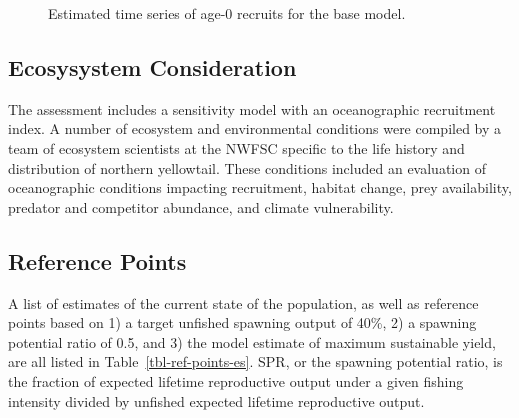 \documentclass[
]{scrartcl}
\begin{document}
\endgroup

\begin{figure}[H]


\caption{\label{fig-es-recruits}Estimated time series of age-0 recruits
for the base model.}

\end{figure}%

\subsection{Ecosysystem Consideration}\label{ecosysystem-consideration}

The assessment includes a sensitivity model with an oceanographic
recruitment index. A number of ecosystem and environmental conditions
were compiled by a team of ecosystem scientists at the NWFSC specific to
the life history and distribution of northern yellowtail. These
conditions included an evaluation of oceanographic conditions impacting
recruitment, habitat change, prey availability, predator and competitor
abundance, and climate vulnerability.

\subsection{Reference Points}\label{reference-points}

A list of estimates of the current state of the population, as well as
reference points based on 1) a target unfished spawning output of 40\%,
2) a spawning potential ratio of 0.5, and 3) the model estimate of
maximum sustainable yield, are all listed in
Table~\ref{tbl-ref-points-es}. SPR, or the spawning potential ratio, is
the fraction of expected lifetime reproductive output under a given
fishing intensity divided by unfished expected lifetime reproductive
output.
\end{document}
